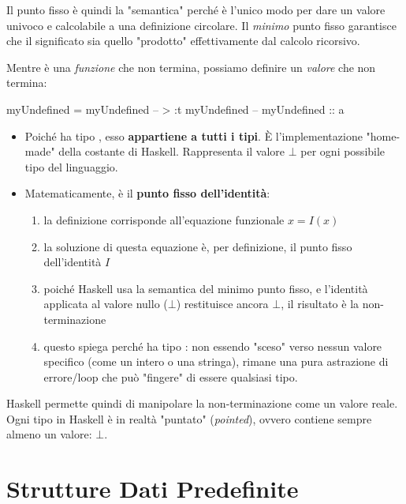 \documentclass[a4paper,11pt]{report}
\begin{document}
Il punto fisso è quindi la "semantica" perché è l'unico modo per dare un valore univoco e calcolabile a una definizione circolare. Il \textit{minimo} punto fisso garantisce che il significato sia quello "prodotto" effettivamente dal calcolo ricorsivo.

\begin{gframe}{}
Mentre  è una \textit{funzione} che non termina, possiamo definire un \textit{valore} che non termina:
\begin{haskellbox}{}
myUndefined = myUndefined
-- > :t myUndefined
-- myUndefined :: a
\end{haskellbox}

\begin{itemize}
    \item  Poiché  ha tipo , esso \textbf{appartiene a tutti i tipi}. È l'implementazione "home-made" della costante  di Haskell. Rappresenta il valore $\bot$ per ogni possibile tipo del linguaggio.
    \item Matematicamente,  è il \textbf{punto fisso dell'identità}: 
\begin{enumerate}
\item la definizione  corrisponde all'equazione funzionale $x = I(x)$
\item la soluzione di questa equazione è, per definizione, il punto fisso dell'identità $I$
\item poiché Haskell usa la semantica del minimo punto fisso, e l'identità applicata al valore nullo ($\bot$) restituisce ancora $\bot$, il risultato è la non-terminazione
\item questo spiega perché  ha tipo : non essendo "sceso" verso nessun valore specifico (come un intero o una stringa), rimane una pura astrazione di errore/loop che può "fingere" di essere qualsiasi tipo.
\end{enumerate}
\end{itemize}



Haskell permette quindi di manipolare la non-terminazione come un valore reale. Ogni tipo in Haskell è in realtà "puntato" (\textit{pointed}), ovvero contiene sempre almeno un valore: $\bot$.
\end{gframe}




\section{Strutture Dati Predefinite}
\end{document}
